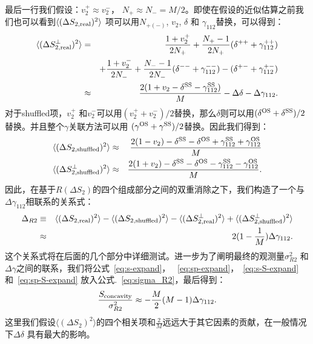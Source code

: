 最后一行我们假设：$v_2^+ \approx v_2^-$， $N_+ \approx N_- = M/2$。即使在假设的近似估算之前我们也可以看到$\langle(\Delta S_{2,\rm real})^2\rangle$ 项可以用$N_{+(-)}$, $v_2$, $\delta$ 和 $\gamma_{112}$替换，可以得到：
\begin{eqnarray}
\langle(\Delta S_{2,\rm real}^\perp)^2\rangle 
&=& \frac{1+v_2^+}{2N_+} + \frac{N_+-1}{2N_+}(\delta^{++}+\gamma^{++}_{112})  \nonumber \\
 && +\frac{1+v_2^-}{2N_-} + \frac{N_--1}{2N_-}(\delta^{--}+\gamma^{--}_{112}) - (\delta^{+-}+\gamma^{+-}_{112}) \\
&\approx& \frac{2(1+v_2-\delta^{\rm SS}-\gamma_{112}^{\rm SS})}{M} - \Delta\delta - \Delta\gamma_{112}.
\label{eq:sp-expand}
\end{eqnarray}
对于shuffled项，$v_2^+$ 和$v_2^-$可以用$(v_2^+ + v_2^-)/2$替换，那么$\delta$则可以用$(\delta^{\rm OS}+\delta^{\rm SS})/2$替换。并且整个$\gamma$关联方法可以用 $(\gamma^{\rm OS}+\gamma^{\rm SS})/2$替换。因此我们得到：
\begin{eqnarray}
\langle(\Delta S_{2,\rm shuffled})^2\rangle 
&\approx& \frac{2(1-v_2)-\delta^{\rm SS}-\delta^{\rm OS}+\gamma_{112}^{\rm SS}+\gamma_{112}^{\rm OS}}{M}
\label{eq:s-S-expand}\\
\langle(\Delta S_{2,\rm shuffled}^\perp)^2\rangle 
&\approx& \frac{2(1+v_2)-\delta^{\rm SS}-\delta^{\rm OS}-\gamma_{112}^{\rm SS}-\gamma_{112}^{\rm OS}}{M}.
\label{eq:sp-S-expand}
\end{eqnarray}
因此，在基于$R(\Delta S_2)$的四个组成部分之间的双重消除之下，我们构造了一个与 $\Delta\gamma_{112}$相联系的关系式：
\begin{eqnarray}
\Delta_{R2} & \equiv &\langle (\Delta S_{2,\rm real})^2 \rangle - \langle (\Delta S_{2,\rm shuffled})^2 \rangle - \langle (\Delta S^{\perp}_{2,\rm real})^2 \rangle  + \langle (\Delta S^{\perp}_{2,\rm shuffled})^2 \rangle   \nonumber \\
 &\approx &2(1-\frac{1}{M})\Delta \gamma_{112}.
\label{eq:relation1}
\end{eqnarray}
这个关系式将在后面的几个部分中详细测试。进一步为了阐明最终的观测量$\sigma^2_{R2}$ 和$\Delta\gamma$之间的联系，我们将公式~\ref{eq:s-expand}， ~\ref{eq:sp-expand}，~\ref{eq:s-S-expand} 和~\ref{eq:sp-S-expand} 放入公式.~\ref{eq:sigma_R2}，最后得到：
\begin{equation}
\frac{S_{\rm concavity}}{\sigma_{R2}^2} \approx -\frac{M}{2}(M-1)\Delta\gamma_{112}.    
\label{eq:relation2}
\end{equation}
这里我们假设$\langle (\Delta S_2)^2\rangle$的四个相关项和$\frac{2}{M}$远远大于其它因素的贡献，在一般情况下$\Delta\delta$ 具有最大的影响。

